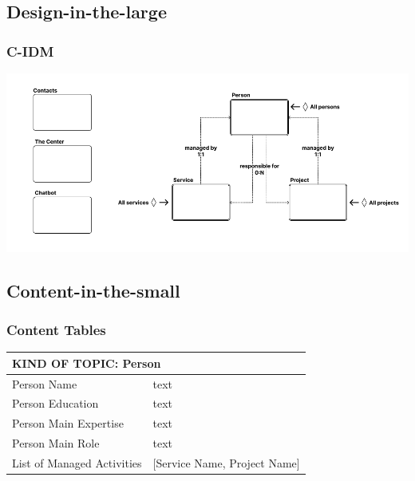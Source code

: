 



\subsection{Design-in-the-large}
\subsubsection{C-IDM}
\includegraphics[width=1\linewidth]{img/design-document/C-IDM.png}

\subsection{Content-in-the-small}
\subsubsection{Content Tables}

\begin{tabular}{ |p{5cm}|p{6cm}| }
    \hline
    \multicolumn{2}{|l|}{\textbf{KIND OF TOPIC: Person}} \\
    \hline
    Person Name & text \\
    \hline
    Person Education & text \\
    \hline
    Person Main Expertise & text \\
    \hline
    Person Main Role & text \\
    \hline
    List of Managed Activities & [Service Name, Project Name]\\
    \hline
\end{tabular}

